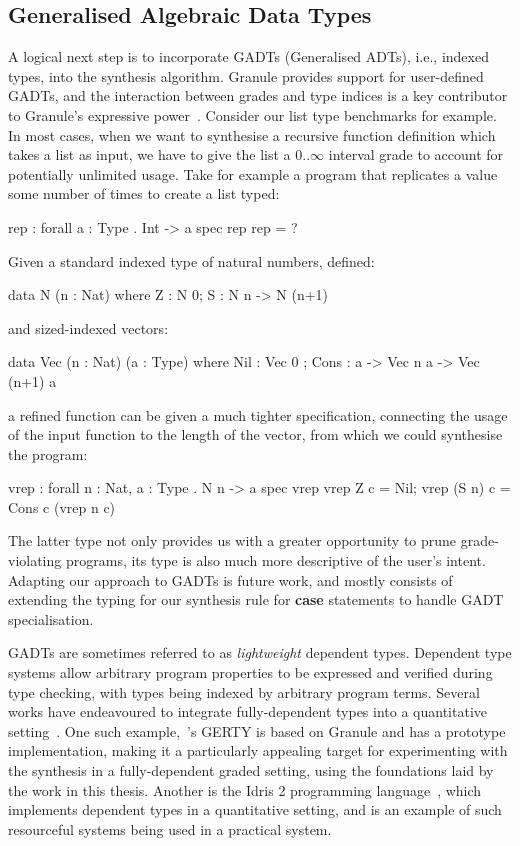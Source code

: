 \subsection{Generalised Algebraic Data Types}
A logical next step is to incorporate GADTs (Generalised ADTs), i.e., indexed
types,  into the synthesis algorithm. Granule provides support for user-defined
GADTs, and the interaction between grades and type indices is a key contributor
to Granule's expressive power~\citep{DBLP:journals/pacmpl/OrchardLE19}. Consider
our list type benchmarks for example. In most cases, when we want to synthesise
a recursive function definition which takes a list as input, we have to give the
list a $0..\infty$ interval grade to account for potentially unlimited usage.
Take for example a program that replicates a value some number of times to create a list typed:
\begin{granule}
rep : forall { a : Type } . Int -> a %
spec
    rep %
rep = ?
\end{granule}
Given a standard indexed type of natural numbers, defined: 
\begin{granule}
data N (n : Nat) where
  Z : N 0;
  S : N n -> N (n+1)
\end{granule}
and sized-indexed vectors:
\begin{granule}
data Vec (n : Nat) (a : Type) where
  Nil  : Vec 0 ;
  Cons : a -> Vec n a -> Vec (n+1) a
\end{granule}
a refined  function can be given a much tighter specification,
connecting the usage of the input function to the length of the vector, from
which we could synthesise the program:
\begin{granule}
vrep : forall { n : Nat, a : Type } . N n -> a %
spec
    vrep %
vrep Z c = Nil;
vrep (S n) c = Cons c (vrep n c)
\end{granule}
The latter type not only provides us with a greater opportunity to prune
grade-violating programs, its type is also much more descriptive of the user's
intent. Adapting our approach to GADTs is future work, and mostly consists of
extending the typing for our synthesis rule for \textbf{case} statements to
handle GADT specialisation.

GADTs are sometimes referred to as \emph{lightweight} dependent types. Dependent
type systems allow arbitrary program properties to be expressed and verified
during type checking, with types being indexed by arbitrary program terms.
Several works have endeavoured to integrate fully-dependent types into a
quantitative setting~\citep{DBLP:journals/pacmpl/ChoudhuryEEW21,
10.1145/3607862, McBride2016, 10.1145/2676726.2676969}. One such
example,~\citet{DBLP:conf/esop/MoonEO21}'s \textsc{GERTY} is based on Granule
and has a prototype implementation, making it a particularly appealing target
for experimenting with the synthesis in a fully-dependent graded setting, using
the foundations laid by the work in this thesis. Another is the Idris 2
programming language~\citep{DBLP:journals/corr/abs-2104-00480}, which implements
dependent types in a quantitative setting, and is an example of such resourceful
systems being used in a practical system.


